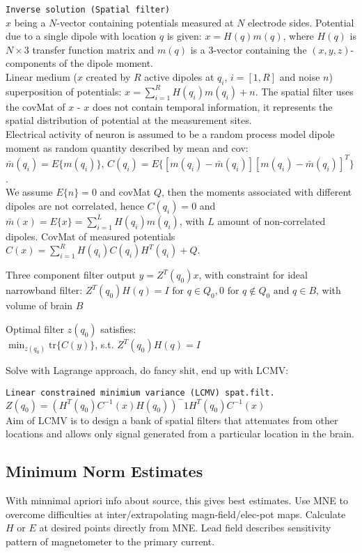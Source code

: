 \verb!Inverse solution (Spatial filter)!\\
$x$ being a $N$-vector containing potentials measured at $N$ electrode sides. Potential due to a single dipole with location $q$ is given: $x=H(q)m(q)$, where $H(q)$ is $N\times 3$ transfer function matrix and $m(q)$ is a 3-vector containing the $(x,y,z)$-components of the dipole moment.\\
Linear medium ($x$ created by $R$ active dipoles at $q_i$, $i=[1,R]$ and noise $n$) \arr superposition of potentials: $x=\sum_{i=1}^R H(q_i)m(q_i)+n$. The spatial filter uses the covMat of $x$ - $x$ does not contain temporal information, it represents the spatial distribution of potential at the measurement sites.\\
Electrical activity of neuron is assumed to be a random process \arr model dipole moment as random quantity described by mean and cov:\\
$\bar{m}(q_i) = E\{m(q_i)\}$, $C(q_i)=E\{[m(q_i)-\bar{m}(q_i)][m(q_i)-\bar{m}(q_i)]^T\}$.\\
We assume $E\{n\}=0$ and covMat $Q$, then the moments associated with different dipoles are not correlated, hence $C(q_i)=0$ and $\bar{m}(x)=E\{x\}=\sum_{i=1}^L H(q_i)m(q_i)$, with $L$ amount of non-correlated dipoles. CovMat of measured potentials $C(x) = \sum_{i=1}^R H(q_i)C(q_i)H^T(q_i)+Q$.\vs

Three component filter output $y = Z^T(q_0)x$, with constraint for ideal narrowband filter: $Z^T(q_0)H(q)=I \text{ for } q\in Q_0, 0 \text{ for } q \not\in Q_0 \text{ and } q\in B$, with volume of brain $B$\vs

Optimal filter $z(q_0)$ satisfies:\\
$\min_{z(q_0)} \text{tr}\{C(y)\}$, s.t. $Z^T(q_0)H(q)=I$\vs

Solve with Lagrange approach, do fancy shit, end up with LCMV:\vs

\verb!Linear constrained minimium variance (LCMV) spat.filt.!\\
$Z(q_0) = (H^T(q_0)C^{-1}(x)H(q_0))^-1 H^T(q_0)C^{-1}(x)$\\
Aim of LCMV is to design a bank of spatial filters that attenuates from other locations and allows only signal generated from a particular location in the brain.

\subsection{Minimum Norm Estimates}
With minnimal apriori info about source, this gives best estimates. Use MNE to overcome difficulties at inter/extrapolating magn-field/elec-pot maps. Calculate $H$ or $E$ at desired points directly from MNE. Lead field describes sensitivity pattern of magnetometer to the primary current.\vs

